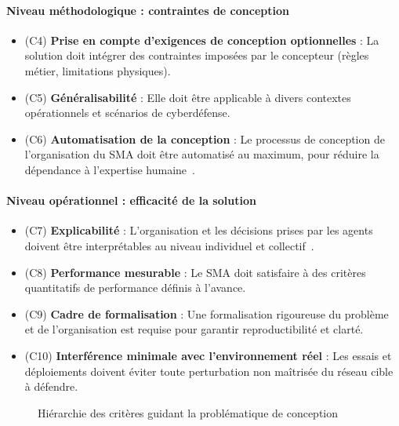 \documentclass[ twoside,openright,titlepage,numbers=noenddot,headinclude,%
                footinclude=true,cleardoublepage=empty,abstractoff, %
                BCOR=5mm,paper=a4,fontsize=11pt,%
                french,american,%
                ]{scrreprt}
\begin{document}
\paragraph{Niveau méthodologique : contraintes de conception}
\begin{itemize}
    \item (C4) \textbf{Prise en compte d'exigences de conception optionnelles} : La solution doit intégrer des contraintes imposées par le concepteur (règles métier, limitations physiques).
    \item (C5) \textbf{Généralisabilité} : Elle doit être applicable à divers contextes opérationnels et scénarios de cyberdéfense.
    \item (C6) \textbf{Automatisation de la conception} : Le processus de conception de l'organisation du SMA doit être automatisé au maximum, pour réduire la dépendance à l'expertise humaine~\cite{Dennis2010}.
\end{itemize}

\paragraph{Niveau opérationnel : efficacité de la solution}
\begin{itemize}
    \item (C7) \textbf{Explicabilité} : L'organisation et les décisions prises par les agents doivent être interprétables au niveau individuel et collectif~\cite{Boella2008}.
    \item (C8) \textbf{Performance mesurable} : Le SMA doit satisfaire à des critères quantitatifs de performance définis à l'avance.
    \item (C9) \textbf{Cadre de formalisation} : Une formalisation rigoureuse du problème et de l'organisation est requise pour garantir reproductibilité et clarté.
    \item (C10) \textbf{Interférence minimale avec l'environnement réel} : Les essais et déploiements doivent éviter toute perturbation non maîtrisée du réseau cible à défendre.
\end{itemize}

\begin{figure}[h]
    \centering
    \caption{Hiérarchie des critères guidant la problématique de conception}
    \label{fig:aica-criteria}
\end{figure}
\end{document}
